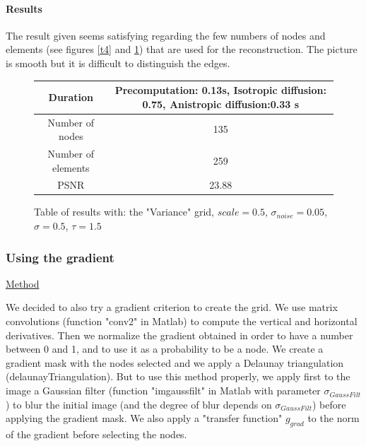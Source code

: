 \documentclass{report}
\begin{document}
        
        
        
\paragraph{Results}

The result given seems satisfying regarding the few numbers of nodes and elements (see figures \ref{t4} and  \ref{T4}) that are used for the reconstruction. The picture is smooth but it is difficult to distinguish the edges. 


        \begin{figure}[h!]
        \centering
        \label{T4}
        \caption{Table of results with: the "Variance" grid, $scale=0.5$, $\sigma_{noise}=0.05$,$\sigma=0.5$, $\tau=1.5$}
        \begin{tabular}{|c|c|}
          \hline
         Duration &  Precomputation: 0.13s,
         Isotropic diffusion: 0.75,
         Anistropic diffusion:0.33 s   \\
        \hline
         Number of nodes & 135 \\
         \hline
         Number of elements & 259\\
 
         \hline
         PSNR & 23.88 \\
         \hline
        \end{tabular}
        \end{figure}






\subsubsection{Using the gradient}
\underline{Method}


We decided to also try a gradient criterion to create the grid. 
We use matrix convolutions (function "conv2" in Matlab) to compute the vertical and horizontal derivatives. Then we normalize the gradient obtained in order to have a number between 0 and 1, and to use it as a probability to be a node. We create a gradient mask with the nodes selected and we apply a Delaunay triangulation (delaunayTriangulation). But to use this method properly, we apply first to the image a Gaussian filter (function "imgaussfilt" in Matlab with parameter $\sigma_{GaussFilt}$) to blur the initial image (and the degree of blur depends on $\sigma_{GaussFilt}$) before applying the gradient mask. We also apply a "transfer function" $g_{grad}$ to the norm of the gradient before selecting the nodes. 
\end{document}
